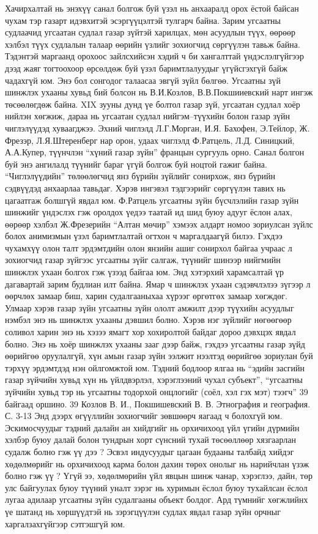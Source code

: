 Хачирхалтай нь энэхүү санал болгож буй үзэл нь анхааралд орох ёстой байсан чухам тэр газарт идэвхитэй эсэргүүцэлтэй тулгарч байна. Зарим угсаатны судлаачид угсаатан судлал газар зүйтэй харилцах, мөн асуудлын түүх, өөрөөр хэлбэл түүх судлалын талаар өөрийн үзлийг зохиогчид сөргүүлэн тавьж байна. Тэдэнтэй маргаанд орохоос зайлсхийсэн хэдий ч би хангалттай үндэслэлгүйгээр дээд жаяг тогтоохоор өрсөлдөж буй үзэл баримтлалуудыг үгүйсгэхгүй байж чадахгүй юм. Энэ бол сонгодог талаасаа эвгүй зүйл бөлгөө.
Угсаатны зүй шинжлэх ухааны хувьд бий болсон нь В.И.Козлов, В.В.Покшииевский нарт ингэж төсөөлөгдөж байна. XIX зууны дунд үе болтол газар зүй, угсаатан судлал хоёр нийлэн хөгжиж, дараа нь угсаатан судлал нийгэм–түүхийн болон газар зүйн чиглэлүүдэд хуваагджээ. Эхний чиглэлд Л.Г.Морган, И.Я. Бахофен, Э.Тейлор, Ж. Фрезэр, Л.Я.Штеренберг нар орон, удаах чиглэлд Ф.Ратцель, Л.Д. Синицкий, А.А.Купер, түүнчлэн “хүний газар зүйн” францын сургууль орно. Санал болгон буй энэ ангилалд түүнийг бараг үгүй болгож буй ноцтой гажиг байна. “Чиглэлүүдийн” төлөөлөгчид янз бүрийн зүйлийг сонирхож, янз бүрийн сэдвүүдэд анхаарлаа тавьдаг. Хэрэв ингэвэл тэдгээрийг сөргүүлэн тавих нь цагаатгаж болшгүй явдал юм. Ф.Ратцель угсаатны зүйн бүсчлэлийн газар зүйн шинжийг үндэслэх гэж оролдох үедээ таатай ид шид буюу адууг ёслон алах, өөрөөр хэлбэл Ж.Фрезерийн “Алтан мөчир” хэмээх алдарт номоо зориулсан зүйлс болох анимизмын үзэл баримтлалтай огтхон ч маргалдаагүй билээ. Гэхдээ чухамхүү олон талт эрдэмтдийн олон янзийн ашиг сонирхол байгаа учраас л зохиогчид газар зүйгээс угсаатны зүйг салгаж, түүнийг шинээр нийгмийн шинжлэх ухаан болгох гэж үзээд байгаа юм. Энд хэтэрхий харамсалтай үр дагавартай зарим будлиан илт байна. Ямар ч шинжлэх ухаан сэдэвчлэлээ зүгээр л өөрчлөх замаар биш, харин судалгааныхаа хүрээг өргөтгөх замаар хөгждөг. Улмаар хэрэв газар зүйн угсаатны зүйн ололт амжилт дээр түүхийн асуудлыг нэмбэл энэ нь шинжлэх ухааны дэвшил болно. Хэрэв нэг зүйлийг нөгөөгөөр соливол харин энэ нь хэзээ ямагт хор хохиролтой байдаг дороо дэвхцэх явдал болно.
Энэ нь хоёр шинжлэх ухааны зааг дээр байж, гэхдээ угсаатны газар зүйд өөрийгөө оруулалгүй, хүн амын газар зүйн ээлжит нээлтэд өөрийгөө зориулан буй тэрхүү эрдэмтдэд нэн ойлгомжтой юм. Тэдний бодлоор ялгаа нь “эдийн засгийн газар зүйчийн хувьд хүн нь үйлдвэрлэл, хэрэглээний чухал субъект”, “угсаатны зүйчийн хувьд тэр нь угсаатны тодорхой онцлогийг (соёл, хэл гэх мэт) тээгч” 39 байгаад оршино.
39 Козлов В. И., Покшишевский В. В. Этнография и география. С. 3-13
Энд дээрх өгүүллийн зохиогчийг зөвшөөрч яагаад ч болохгүй юм. Эскимосчуудыг тэдний далайн ан хийдгийг нь орхичихоод үйл үгийн дүрмийн хэлбэр буюу далай болон тундрын хорт сүнсний тухай төсөөллөөр хязгаарлан судалж болно гэж үү дээ ? Эсвэл индусуудыг цагаан будааны талбайд хийдэг хөдөлмөрийг нь орхичихоод карма болон дахин төрөх онолыг нь нарийчлан үзэж болно гэж үү ? Үгүй ээ, хөдөлмөрийн үйл явцын шинж чанар, хэрэглээ, дайн, төр улс байгуулах буюу түүний уналт зэрэг нь хуримын ёслол буюу тухайлсан ёслол лугаа адилаар угсаатны зүйн судалгааны объект болдог. Ард түмнийг хөгжлийнх үе шатанд нь хөршүүдтэй нь зэрэгцүүлэн судлах явдал газар зүйн орчныг харгалзахгүйгээр сэтгэшгүй юм.
